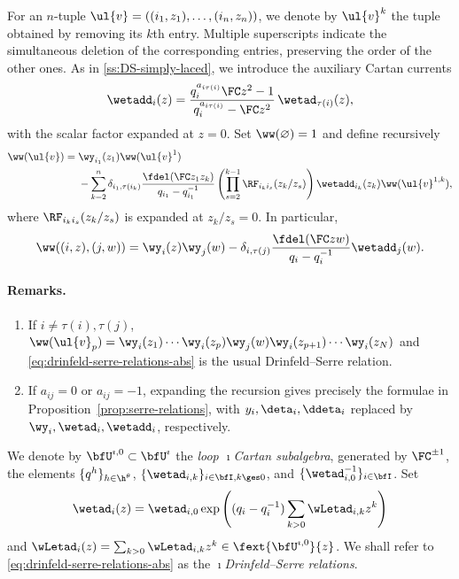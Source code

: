 \documentclass[reqno]{amsart}
\numberwithin{equation}{section}
\newenvironment{remarks}{\medskip\paragraph{{\bf Remarks.} }}{\par\medskip}
\begin{document}
For an $n$-tuple $\ul{v}=((i_1,z_1),\ldots,(i_n,z_n))$, we denote by
$\ul{v}^k$ the tuple obtained by removing its $k$th entry. Multiple
superscripts indicate the simultaneous deletion of the corresponding entries, preserving the order of the other ones. As in \ref{ss:DS-simply-laced}, we introduce the auxiliary Cartan currents
\begin{equation}\label{eq:abstract-serre-cartan}
\wetadd_i(z)=
\frac{q_i^{a_{i\tau(i)}}\FC z^2-1}
  {q_i^{a_{i\tau(i)}}-\FC z^2}\,
\wetad_{\tau(i)}(z),
\end{equation}
with the scalar factor expanded at $z=0$.
Set $\ww(\varnothing)=1$ and define recursively
\begin{equation}\label{eq:abstract-serre-W-recursion}
\begin{aligned}
\ww(\ul{v})={}&\wy_{i_1}(z_1)\ww(\ul{v}^1)\\
&-\sum_{k=2}^n
\delta_{i_1,\tau(i_k)}\frac{\fdel(\FC z_1z_k)}
 {q_{i_1}-q_{i_1}^{-1}}
\left(\prod_{s=2}^{k-1}\RF_{i_k i_s}(z_k/z_s)\right)
\wetadd_{i_k}(z_k)\ww(\ul{v}^{1,k}),
\end{aligned}
\end{equation}
where $\RF_{i_k i_s}(z_k/z_s)$ is expanded at $z_k/z_s=0$.
In particular,
\[
\ww((i,z),(j,w))=
\wy_i(z)\wy_j(w)-
\delta_{i,\tau(j)}\frac{\fdel(\FC zw)}{q_i-q_i^{-1}}
\wetadd_j(w).
\]
\begin{remarks}
\hfill
\begin{enumerate}[leftmargin=2em]\itemsep0.25cm
\item	
If $i\neq\tau(i),\tau(j)$, $\ww(\ul{v}_p)=\wy_i(z_1)\cdots \wy_i(z_p)\wy_j(w)
\wy_i(z_{p+1})\cdots \wy_i(z_N)$ and \eqref{eq:drinfeld-serre-relations-abs} is the usual Drinfeld--Serre relation.
\item 
If $a_{ij}=0$ or $a_{ij}=-1$, expanding the recursion gives precisely the
formulae in Proposition~\ref{prop:serre-relations}, with
$y_i,\deta_i,\ddeta_i$ replaced by
$\wy_i,\wetad_i,\wetadd_i$, respectively.
\hfill\rmkend
\end{enumerate}
\end{remarks}

We denote by $\bfU^{\imath,0}\subset\bfU^\imath$ the {\em loop $\imath$Cartan subalgebra}, generated by $\FC^{\pm1}$, the elements $\{q^h\}_{h\in\h^{\theta}}$, 
$\{\wetad_{i,k}\}_{i\in\bfI, k\ges 0}$, and $\{\wetad_{i,0}^{-1}\}_{i\in\bfI}$.
Set
\begin{equation}\label{eq:def-rho-bis}
\wetad_i(z)=\wetad_{i,0}\exp\left((q_i-q_i^{-1})\sum_{k>0}\wLetad_{i,k}z^k\right)
\end{equation}
and $\wLetad_i(z)=\sum_{k>0}\wLetad_{i,k}z^k\in\fext{\bfU^{\imath,0}}{z}$.
We shall refer to  \eqref{eq:drinfeld-serre-relations-abs} as the {\em $\imath$Drinfeld--Serre relations}.
\end{document}
